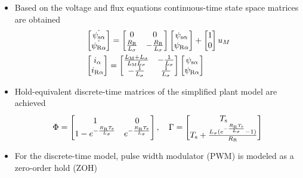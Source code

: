 \documentclass[11pt,aspectratio=169]{beamer}
\begin{document}
\begin{frame}
\begin{itemize}
	\item Based on the voltage and flux equations continuous-time state space matrices are obtained
	\begin{align*}
&\begin{bmatrix}
\dot{\psi_{\text{s}\alpha}} \\ 
\dot{\psi_{\text{R}\alpha}}
\end{bmatrix}
=\begin{bmatrix}
0 & 0\\
\frac{R_{\text{R}}}{L_\sigma} & -\frac{R_{\text{R}}}{L_\sigma}
\end{bmatrix}
\begin{bmatrix}
\psi_{\text{s}\alpha}\\
\psi_{\text{R}\alpha}
\end{bmatrix}
+\begin{bmatrix}
1\\
0
\end{bmatrix}
u_{M}\\
&\begin{bmatrix}
i_{\alpha}\\
i_{\text{R}\alpha}
\end{bmatrix}
=
\begin{bmatrix}
\frac{L_{\text{M}}+L_\sigma}{L_{\text{M}}L_\sigma} & -\frac{1}{L_\sigma}\\
-\frac{1}{L_\sigma} & \frac{1}{L_\sigma}
\end{bmatrix}
\begin{bmatrix}
\psi_{\text{s}\alpha}\\
\psi_{\text{R}\alpha}
\end{bmatrix}
\end{align*}

\end{itemize}
  \begin{itemize}
\item Hold-equivalent discrete-time matrices of the simplified plant model are achieved 
\begin{align*} 
\Phi=
\begin{bmatrix}
1 & 0\\
1-e^{-\frac{R_{\text{R}}T_{\text{s}}}{L_{\sigma}}} & e^{-\frac{R_{\text{R}}T_{\text{s}}}{L_\sigma}}
\end{bmatrix} ,  \quad 
\Gamma=
\begin{bmatrix}
T_{\text{s}}\\
T_{\text{s}}+\frac{L_\sigma(e^{-\frac{R_{\text{R}}T_{\text{s}}}{L_\sigma}}-1)}{R_{\text{R}}}
\end{bmatrix}
\end{align*}
\item For the discrete-time model, pulse width modulator (PWM) is modeled as a zero-order hold (ZOH)
\end{itemize}
\end{frame}
\end{document}
